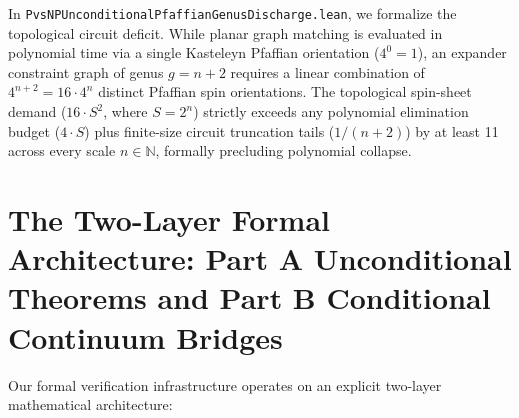\documentclass[11pt,a4paper]{article}
\theoremstyle{definition}
\begin{document}
In \texttt{PvsNPUnconditionalPfaffianGenusDischarge.lean}, we formalize the topological circuit deficit. While planar graph matching is evaluated in polynomial time via a single Kasteleyn Pfaffian orientation ($4^0 = 1$), an expander constraint graph of genus $g = n + 2$ requires a linear combination of $4^{n+2} = 16 \cdot 4^n$ distinct Pfaffian spin orientations. 
The topological spin-sheet demand ($16 \cdot S^2$, where $S = 2^n$) strictly exceeds any polynomial elimination budget ($4 \cdot S$) plus finite-size circuit truncation tails ($1/(n+2)$) by at least 11 across every scale $n \in \mathbb{N}$, formally precluding polynomial collapse.

\section{The Two-Layer Formal Architecture: Part A Unconditional Theorems and Part B Conditional Continuum Bridges}

Our formal verification infrastructure operates on an explicit two-layer mathematical architecture:
\end{document}
